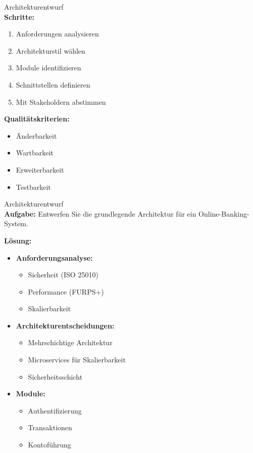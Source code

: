 \begin{KR}{Architekturentwurf}\\
\textbf{Schritte:}
\begin{enumerate}
    \item Anforderungen analysieren
    \item Architekturstil wählen
    \item Module identifizieren
    \item Schnittstellen definieren
    \item Mit Stakeholdern abstimmen
\end{enumerate}

\textbf{Qualitätskriterien:}
\begin{itemize}
    \item Änderbarkeit
    \item Wartbarkeit
    \item Erweiterbarkeit
    \item Testbarkeit
\end{itemize}
\end{KR}

\begin{example2}{Architekturentwurf}\\
\textbf{Aufgabe:} Entwerfen Sie die grundlegende Architektur für ein Online-Banking-System.

\textbf{Lösung:}
\begin{itemize}
    \item \textbf{Anforderungsanalyse:}
    \begin{itemize}
        \item Sicherheit (ISO 25010)
        \item Performance (FURPS+)
        \item Skalierbarkeit
    \end{itemize}
    
    \item \textbf{Architekturentscheidungen:}
    \begin{itemize}
        \item Mehrschichtige Architektur
        \item Microservices für Skalierbarkeit
        \item Sicherheitsschicht
    \end{itemize}
    
    \item \textbf{Module:}
    \begin{itemize}
        \item Authentifizierung
        \item Transaktionen
        \item Kontoführung
    \end{itemize}
\end{itemize}
\end{example2}

